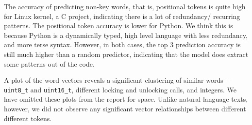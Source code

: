 The accuracy of predicting non-key words, that is, positional tokens is quite
high for Linux kernel, a C project, indicating there is a lot of redundancy/
recurring patterns. The positional token accuracy is lower for Python.
We think this is because Python is a dynamically typed, high level
language with less redundancy, and more terse syntax.
However, in both cases, the top 3 prediction
accuracy is still much higher than a random predictor, indicating that the
model does extract some patterns out of the code.

A plot of the word vectors reveals a significant clustering of similar
words --- {\texttt {uint8\_t}} and {\texttt {uint16\_t}}, different locking and
unlocking calls, and integers. We have omitted these plots from the report for
space. Unlike natural language texts, however,
we did not observe any significant vector relationships between different
different tokens.
